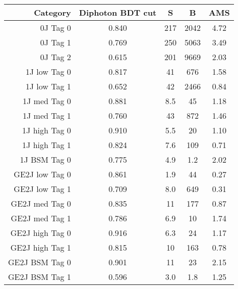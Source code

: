 \begin{tabular}{ r | c | c | c | c } 
\hline 
Category         & Diphoton BDT cut & S      & B          & AMS \\
\hline 
0J Tag 0         & 0.840            & 217    & 2042       & 4.72                    \\
0J Tag 1         & 0.769            & 250    & 5063       & 3.49                    \\
0J Tag 2         & 0.615            & 201    & 9669       & 2.03                    \\
\hline                                                                              
1J low  Tag 0    & 0.817            & 41     & 676        & 1.58                    \\
1J low  Tag 1    & 0.652            & 42     & 2466       & 0.84                    \\
1J med  Tag 0    & 0.881            & 8.5    & 45         & 1.18                    \\
1J med  Tag 1    & 0.760            & 43     & 872        & 1.46                    \\
1J high Tag 0    & 0.910            & 5.5    & 20         & 1.10                    \\
1J high Tag 1    & 0.824            & 7.6    & 109        & 0.71                    \\
1J BSM  Tag 0    & 0.775            & 4.9    & 1.2        & 2.02                    \\
\hline                                                                              
GE2J low  Tag 0  & 0.861            & 1.9    & 44         & 0.27                    \\
GE2J low  Tag 1  & 0.709            & 8.0    & 649        & 0.31                    \\
GE2J med  Tag 0  & 0.835            & 11     & 177        & 0.87                    \\
GE2J med  Tag 1  & 0.786            & 6.9    & 10         & 1.74                    \\
GE2J high Tag 0  & 0.916            & 6.3    & 24         & 1.17                    \\
GE2J high Tag 1  & 0.815            & 10     & 163        & 0.78                    \\
GE2J BSM  Tag 0  & 0.901            & 11     & 23         & 2.15                    \\
GE2J BSM  Tag 1  & 0.596            & 3.0    & 1.8        & 1.25                    \\
\hline 
\end{tabular}
